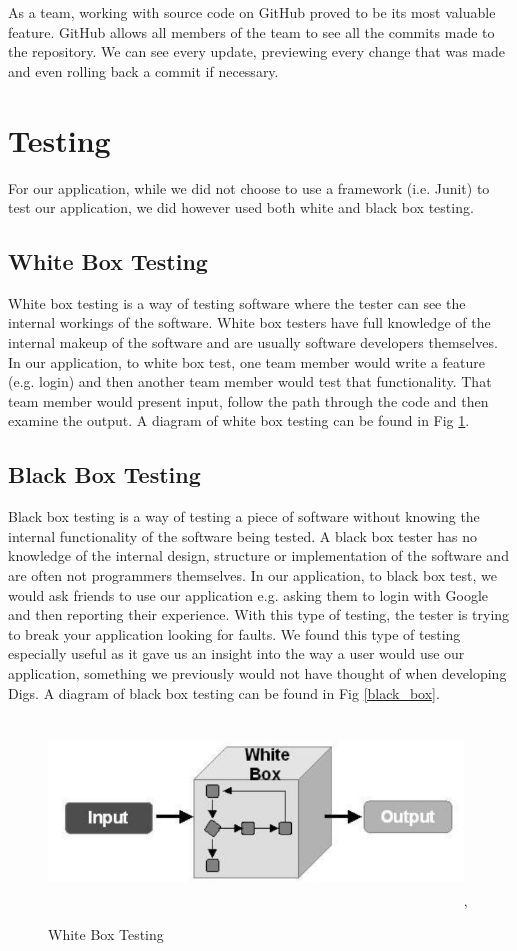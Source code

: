 \noindent As a team, working with source code on GitHub proved to be its most valuable feature. GitHub allows all members of the team to see all the commits made to the repository. We can see every update, previewing every change that was made and even rolling back a commit if necessary.

\section{Testing}
For our application, while we did not choose to use a framework (i.e. Junit) to test our application, we did however used both white and black box testing.

\subsection{White Box Testing}
White box testing is a way of testing software where the tester can see the internal workings of the software. White box testers have full knowledge of the internal makeup of the software and are usually software developers themselves. In our application, to white box test, one team member would write a feature (e.g. login) and then another team member would test that functionality. That team member would present input, follow the path through the code and then examine the output. A diagram of white box testing can be found in Fig \ref{white_box}.

\subsection{Black Box Testing}
Black box testing is a way of testing a piece of software without knowing the internal functionality of the software being tested. A black box tester has no knowledge of the internal design, structure or implementation of the software and are often not programmers themselves. In our application, to black box test, we would ask friends to use our application e.g. asking them to login with Google and then reporting their experience. With this type of testing, the tester is trying to break your application looking for faults. We found this type of testing especially useful as it gave us an insight into the way a user would use our application, something we previously would not have thought of when developing Digs. A diagram of black box testing can be found in Fig \ref{black_box}.\\

\begin{figure}[h]
\centering
\includegraphics[width=11cm, height=5cm]{img/white_box.PNG},
\caption{White Box Testing}
\label{white_box}
\end{figure}

